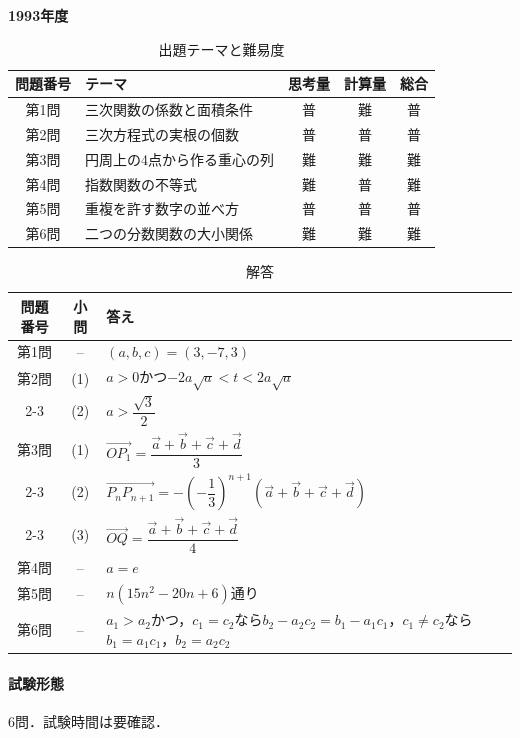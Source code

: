 \documentclass[../../main.tex]{subfiles}
\begin{document}
\begin{center}
  {\fontsize{48pt}{58pt}\selectfont \textbf{1993}\normalsize\textbf{年度}}
\end{center}

\begin{table}[htb]
  \centering
  \caption{出題テーマと難易度}
  \begin{tabular}{|c|p{6.2cm}|c|c|c|}
    \hline
    \textbf{問題番号} & \textbf{テーマ} & \textbf{思考量} & \textbf{計算量} & \textbf{総合} \\
    \hline
    第1問 & 三次関数の係数と面積条件 & 普 & 難 & 普 \\
    \hline
    第2問 & 三次方程式の実根の個数 & 普 & 普 & 普 \\
    \hline
    第3問 & 円周上の4点から作る重心の列 & 難 & 難 & 難 \\
    \hline
    第4問 & 指数関数の不等式 & 難 & 普 & 難 \\
    \hline
    第5問 & 重複を許す数字の並べ方 & 普 & 普 & 普 \\
    \hline
    第6問 & 二つの分数関数の大小関係 & 難 & 難 & 難 \\
    \hline
  \end{tabular}
\end{table}

\begin{table}[htb]
  \centering
  \caption{解答}
  \renewcommand{\arraystretch}{1.4}
  \begin{tabular}{|c|c|p{9cm}|}
    \hline
    \textbf{問題番号} & \textbf{小問} & \textbf{答え} \\
    \hline
    第1問 & -- & $(a,b,c)=(3,-7,3)$ \\
    \hline
    第2問 & (1) & $a>0$かつ$-2a\sqrt{a}<t<2a\sqrt{a}$ \\
    \cline{2-3}
    & (2) & $a>\dfrac{\sqrt{3}}{2}$ \\
    \hline
    第3問 & (1) & $\overrightarrow{OP_1}=\dfrac{\vec{a}+\vec{b}+\vec{c}+\vec{d}}{3}$ \\
    \cline{2-3}
    & (2) & $\overrightarrow{P_nP_{n+1}}=-\left(-\dfrac{1}{3}\right)^{n+1}(\vec{a}+\vec{b}+\vec{c}+\vec{d})$ \\
    \cline{2-3}
    & (3) & $\overrightarrow{OQ}=\dfrac{\vec{a}+\vec{b}+\vec{c}+\vec{d}}{4}$ \\
    \hline
    第4問 & -- & $a=e$ \\
    \hline
    第5問 & -- & $n(15n^2-20n+6)$通り \\
    \hline
    第6問 & -- & $a_1>a_2$かつ，$c_1=c_2$なら$b_2-a_2c_2=b_1-a_1c_1$，$c_1\ne c_2$なら$b_1=a_1c_1$，$b_2=a_2c_2$ \\
    \hline
  \end{tabular}
\end{table}

\paragraph{試験形態}
6問．試験時間は要確認．
\end{document}

